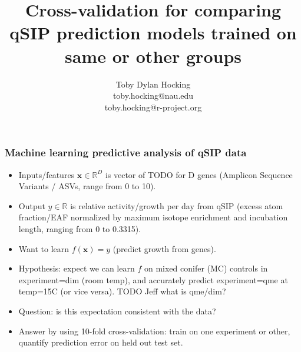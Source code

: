 \documentclass{beamer}
\begin{document}
\title{Cross-validation for comparing qSIP prediction models trained
  on same or other groups}

\author{
  Toby Dylan Hocking\\
  toby.hocking@nau.edu\\
  toby.hocking@r-project.org\\
}

\maketitle

\begin{frame}
  \frametitle{Machine learning predictive analysis of qSIP data}
  \begin{itemize}
  \item Inputs/features $\mathbf x\in\mathbb R^D$ is vector of TODO for D genes
    (Amplicon Sequence Variants / ASVs, range from 0 to 10).
  \item Output $y\in\mathbb R$ is relative activity/growth per day
    from qSIP (excess atom fraction/EAF normalized by maximum isotope enrichment
    and incubation length, ranging from 0 to 0.3315).
  \item Want to learn $ f(\mathbf x)=y$ (predict growth from genes).
  \item Hypothesis: expect we can learn $f$ on mixed conifer (MC) controls in experiment=dim (room temp), and accurately predict experiment=qme at temp=15C (or vice versa). TODO Jeff what is qme/dim?
  \item Question: is this expectation consistent with the data?
  \item Answer by using 10-fold cross-validation: train on one experiment or other, quantify prediction error on held out test set.
  \end{itemize}
\end{frame}
\end{document}
